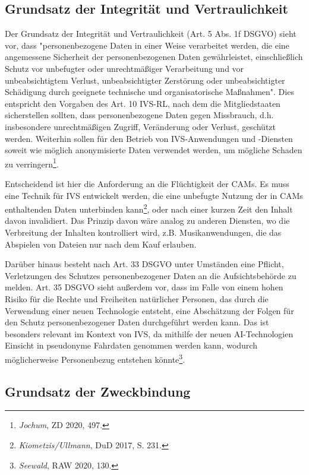 \subsection{Grundsatz der Integrität und Vertraulichkeit}

Der Grundsatz der Integrität und Vertraulichkeit (Art. 5 Abs. 1f DSGVO) sieht vor, dass "personenbezogene Daten in einer Weise verarbeitet werden, die eine angemessene Sicherheit der personenbezogenen Daten gewährleistet, einschließlich Schutz vor unbefugter oder unrechtmäßiger Verarbeitung und vor unbeabsichtigtem Verlust, unbeabsichtigter Zerstörung oder unbeabsichtigter Schädigung durch geeignete technische und organisatorische Maßnahmen". Dies entspricht den Vorgaben des Art. 10 IVS-RL, nach dem die Mitgliedstaaten sicherstellen sollten, dass personenbezogene Daten gegen Missbrauch, d.h. insbesondere unrechtmäßigen Zugriff, Veränderung oder Verlust, geschützt werden. Weiterhin sollen für den Betrieb von IVS-Anwendungen und -Diensten soweit wie möglich anonymisierte Daten verwendet werden, um mögliche Schaden zu verringern\footnote{\emph{Jochum}, ZD 2020, 497.}. 

Entscheidend ist hier die Anforderung an die Flüchtigkeit der CAMs. Es muss eine Technik für IVS entwickelt werden, die eine unbefugte Nutzung der in CAMs enthaltenden Daten unterbinden kann\footnote{\emph{Kiometzis/Ullmann}, DuD 2017, S. 231.}, oder nach einer kurzen Zeit den Inhalt davon invalidiert. Das Prinzip davon wäre analog zu anderen Diensten, wo die Verbreitung der Inhalten kontrolliert wird, z.B. Musikanwendungen, die das Abspielen von Dateien nur nach dem Kauf erlauben. 

Darüber hinaus besteht nach Art. 33 DSGVO unter Umständen eine Pflicht, Verletzungen des Schutzes personenbezogener Daten an die Aufsichtsbehörde zu melden. Art. 35 DSGVO sieht außerdem vor, dass im Falle von einem hohen Risiko für die Rechte und Freiheiten natürlicher Personen, das durch die Verwendung einer neuen Technologie entsteht, eine Abschätzung der Folgen für den Schutz personenbezogener Daten durchgeführt werden kann. Das ist besonders relevant im Kontext von IVS, da mithilfe der neuen AI-Technologien Einsicht in pseudonyme Fahrdaten genommen werden kann, wodurch möglicherweise Personenbezug entstehen könnte\footnote{\emph{Seewald}, RAW 2020, 130.}. \nocite{Seewald2018}

\subsection{Grundsatz der Zweckbindung}

